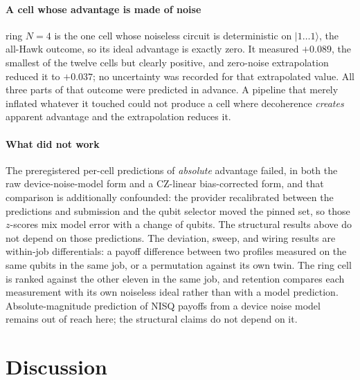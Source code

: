 \documentclass[conference,letterpaper,10pt]{IEEEtran}
\newcommand{\ket}[1]{\ensuremath{|#1\rangle}}
\begin{document}
\paragraph{A cell whose advantage is made of noise}
ring $N=4$ is the one cell whose noiseless circuit is deterministic on $\ket{1\ldots1}$, the all-Hawk outcome, so its ideal advantage is exactly
zero. It measured $+0.089$, the smallest of the twelve cells but clearly
positive, and zero-noise extrapolation reduced it to $+0.037$; no uncertainty
was recorded for that extrapolated value. All three parts of that outcome
were predicted in advance. A pipeline that merely inflated whatever it touched
could not produce a cell where decoherence \emph{creates} apparent advantage
and the extrapolation reduces it.

\paragraph{What did not work}
The preregistered per-cell predictions of \emph{absolute} advantage failed, in
both the raw device-noise-model form and a CZ-linear bias-corrected form, and
that comparison is additionally confounded: the provider recalibrated between
the predictions and submission and the qubit selector moved the pinned set, so
those $z$-scores mix model error with a change of qubits. The structural
results above do not depend on those predictions. The deviation, sweep, and
wiring results are within-job differentials: a payoff difference between two
profiles measured on the same qubits in the same job, or a permutation against
its own twin. The ring cell is ranked against the other eleven in the same
job, and retention compares each measurement with its own noiseless ideal
rather than with a model prediction.
Absolute-magnitude prediction of NISQ payoffs from a device noise model remains
out of reach here; the structural claims do not depend on it.



\section{Discussion}\label{sec:discussion}
\end{document}
